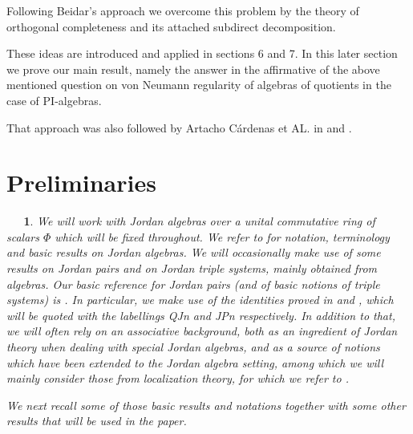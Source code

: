 \documentclass[a4paper,twoside,11pt]{article}
\theoremstyle{plain}
\theoremstyle{miestilo}
\theoremstyle{misnotas}
\newtheorem{apartado}[subsection]{\ {\ }}
\begin{document}
 Following Beidar's approach we overcome this problem by the theory of orthogonal completeness and its attached subdirect decomposition.

 These ideas are introduced and applied in sections 6 and 7. In this later section we prove our main result, namely the answer in the affirmative of the above mentioned question on von Neumann regularity of algebras of quotients in the case of PI-algebras.

That approach was also followed by Artacho C\'{a}rdenas et AL. in \cite{agr1} and \cite{agr2}.

%
%

\section{Preliminaries}\label{pre}

\begin{apartado}





  We will work with  Jordan  algebras over a unital commutative ring of scalars $\Phi$
   which will be fixed throughout. We refer to
\cite{jac-struc, mcz} for   notation, terminology and basic
results on Jordan algebras. We will occasionally make use of some results on  Jordan pairs and on Jordan triple systems, mainly
obtained from algebras. Our basic reference for Jordan pairs (and of basic notions of triple systems) is \cite{loos-jp}. In particular, we make use of the identities proved in
\cite{jac-struc} and \cite{loos-jp}, which will be quoted with the
labellings QJn and JPn respectively. In addition to that, we will often rely on an associative background, both as an ingredient of Jordan theory when dealing with special Jordan algebras, and as a source of notions which have been extended to the Jordan algebra setting, among which we will mainly consider those  from localization theory, for which we refer to \cite{st}.



We next recall some
of those basic results  and notations together with some other results  that will
be used in the paper.
\end{apartado}
\end{document}
